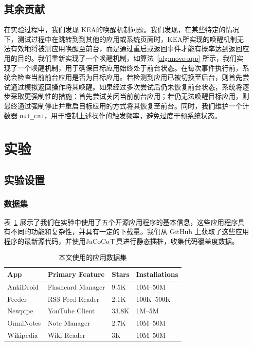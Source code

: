 \documentclass[twocolumn, 10pt]{article}
\newcommand{\kea}{K{\small\MakeUppercase{ea}}}
\begin{document}
\subsection{其余贡献}
\label{sec:other}

在实验过程中，我们发现 \kea 的唤醒机制问题。我们发现，在某些特定的情况下，测试过程中在跳转到到其他的应用或系统页面时，\kea 所实现的唤醒机制无法有效地将被测应用唤醒至前台，而是通过重启或返回事件才能有概率达到返回应用的目的。我们重新实现了一个唤醒机制，如算法~\ref{alg:move-app} 所示，我们实现了一个唤醒机制，用于确保目标应用始终处于前台状态。在每次事件执行前，系统会检查当前前台应用是否为目标应用。若检测到应用已被切换至后台，则首先尝试通过模拟返回操作将其唤醒。如果经过多次尝试后仍未恢复前台状态，系统将逐步采取更强制性的措施：首先尝试关闭当前前台应用；若仍无法唤醒目标应用，则最终通过强制停止并重启目标应用的方式将其恢复至前台。同时，我们维护一个计数器 \texttt{out\_cnt}，用于控制上述操作的触发频率，避免过度干预系统状态。

\section{实验}

\subsection{实验设置}
\label{sec:setup}

\subsubsection{数据集}

表~\ref{tab:app-dataset} 展示了我们在实验中使用了五个开源应用程序的基本信息，这些应用程序具有不同的功能和复杂性，并具有一定的下载量。我们从 GitHub 上获取了这些应用程序的最新源代码，并使用JaCoCo\cite{jacoco}工具进行静态插桩，收集代码覆盖度数据。

\begin{table}[t]
\small
\centering
\caption{本文使用的应用数据集}
\label{tab:app-dataset}
\begin{tabular}{@{}llll@{}}
\toprule
\textbf{App}    & \textbf{Primary Feature}        & \textbf{Stars} & \textbf{Installations} \\ 
\midrule
AnkiDroid   & Flashcard Manager     & 9.5K         & 10M–50M       \\
Feeder      & RSS Feed Reader        & 2.1K         & 100K–500K     \\
Newpipe     & YouTube Client         & 33.8K        & 1M–5M         \\
OmniNotes   & Note Manager           & 2.7K         & 10M–50M       \\
Wikipedia   & Wiki Reader    & 3K           & 10M–50M       \\
\bottomrule
\end{tabular}
\end{table}
\end{document}
